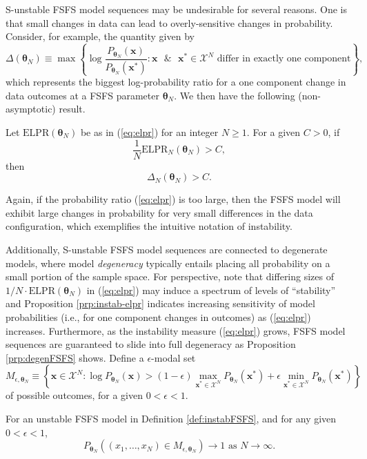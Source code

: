 \documentclass[12pt]{article}
\theoremstyle{definition}
\let\BeginKnitrBlock\begin \let\EndKnitrBlock\end
\begin{document}
S-unstable FSFS model sequences may be undesirable for several reasons.
One is that small changes in data can lead to overly-sensitive changes
in probability. Consider, for example, the quantity given by \[
\Delta(\boldsymbol \theta_N) \equiv \max \left\{\log \frac{P_{\boldsymbol \theta_N}(\boldsymbol x)}{P_{\boldsymbol \theta_N}(\boldsymbol x^*)} : \boldsymbol x \text{ }\& \text{ } \boldsymbol x^* \in \mathcal{X}^N \text{ differ in exactly one component}\right\},
\] which represents the biggest log-probability ratio for a one
component change in data outcomes at a FSFS parameter
\(\boldsymbol \theta_N\). We then have the following (non-asymptotic)
result.

\BeginKnitrBlock{proposition}
\protect\hypertarget{prp:instab-elpr}{}{\label{prp:instab-elpr}}Let
\(\text{ELPR}(\boldsymbol \theta_N)\) be as in (\eqref{eq:elpr}) for an
integer \(N \ge 1\). For a given \(C>0\), if
\[\frac{1}{N}\text{ELPR}_N(\boldsymbol \theta_N) > C,\] then
\[\Delta_N(\boldsymbol \theta_N) > C.\]
\EndKnitrBlock{proposition}

Again, if the probability ratio (\eqref{eq:elpr}) is too large, then the
FSFS model will exhibit large changes in probability for very small
differences in the data configuration, which exemplifies the intuitive
notation of instability.

Additionally, S-unstable FSFS model sequences are connected to
degenerate models, where model \emph{degeneracy} typically entails
placing all probability on a small portion of the sample space. For
perspective, note that differing sizes of
\(1/N\cdot\text{ELPR}(\boldsymbol \theta_N)\) in (\eqref{eq:elpr}) may
induce a spectrum of levels of ``stability'' and Proposition
\ref{prp:instab-elpr} indicates increasing sensitivity of model
probabilities (i.e., for one component changes in outcomes) as
(\eqref{eq:elpr}) increases. Furthermore, as the instability measure
(\eqref{eq:elpr}) grows, FSFS model sequences are guaranteed to slide into
full degeneracy as Proposition \ref{prp:degenFSFS} shows. Define a
\(\epsilon\)-modal set \[
M_{\epsilon, \boldsymbol \theta_N} \equiv \left\{\boldsymbol x \in \mathcal{X}^N: \log P_{\boldsymbol \theta_N}(\boldsymbol x) > (1-\epsilon)\max\limits_{\boldsymbol x^* \in \mathcal{X}^N}P_{\boldsymbol \theta_N}(\boldsymbol x^*) + \epsilon\min\limits_{\boldsymbol x^* \in \mathcal{X}^N}P_{\boldsymbol \theta_N}(\boldsymbol x^*) \right\}
\] of possible outcomes, for a given \(0 < \epsilon < 1\).

\BeginKnitrBlock{proposition}
\protect\hypertarget{prp:degenFSFS}{}{\label{prp:degenFSFS}}For an unstable
FSFS model in Definition \ref{def:instabFSFS}, and for any given
\(0 < \epsilon < 1\), \[
P_{\boldsymbol \theta_N}\left((x_1, \dots, x_N) \in M_{\epsilon, \boldsymbol \theta_N}\right) \rightarrow 1 \text{ as } N \rightarrow \infty.
\]
\EndKnitrBlock{proposition}
\end{document}
